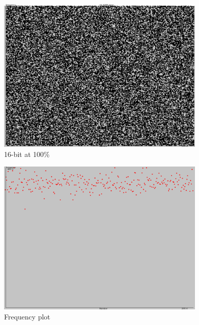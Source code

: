 \documentclass[a4paper,11pt,titlepage]{article}
\begin{document}
\begin{figure}[htbp]
   \centering
   \includegraphics[width=10cm]{snapshot10.png}
   \caption{16-bit at 100\%}
   \label{Figure:figex}
\end{figure}
\begin{figure}[htbp]
   \centering
   \includegraphics[width=10cm]{snapshot11.png}
   \caption{Frequency plot}
   \label{Figure:figex}
\end{figure}
\newpage
\end{document}
